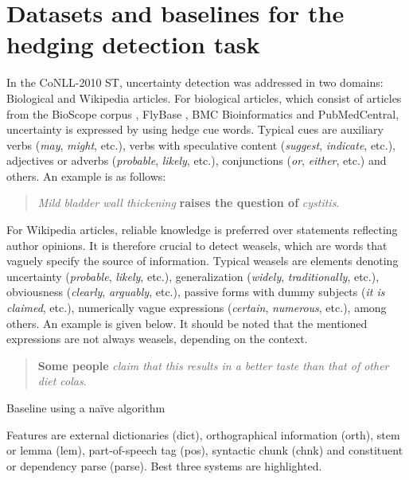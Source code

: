 \documentclass[english]{jnlp_1.4}
\begin{document}
\section{Datasets and baselines for the hedging detection task}

In the CoNLL-2010 ST, uncertainty detection was addressed in two domains: Biological and Wikipedia articles. For biological articles, which consist of articles from the BioScope corpus \cite{vincze08}, FlyBase , BMC Bioinformatics and PubMedCentral, uncertainty is expressed by using hedge cue words. Typical cues are auxiliary verbs (\emph{may}, \emph{might}, etc.), verbs with speculative content (\emph{suggest}, \emph{indicate}, etc.), adjectives or adverbs (\emph{probable}, \emph{likely}, etc.), conjunctions (\emph{or}, \emph{either}, etc.) and others. An example is as follows:

\vspace{0.5\Cvs}
\begin{quote}
	\emph{Mild bladder wall thickening }\textbf{raises the question of}\emph{ cystitis}.
\end{quote}
\vspace{0.5\Cvs}

For Wikipedia articles, reliable knowledge is preferred over statements reflecting author opinions. It is therefore crucial to detect weasels, which are words that vaguely specify the source of information. Typical weasels are elements denoting uncertainty (\emph{probable}, \emph{likely}, etc.), generalization (\emph{widely}, \emph{traditionally}, etc.), obviousness (\emph{clearly}, \emph{arguably}, etc.), passive forms with dummy subjects (\emph{it is claimed}, etc.), numerically vague expressions (\emph{certain}, \emph{numerous}, etc.), among others. An example is given below. It should be noted that the mentioned expressions are not always weasels, depending on the context.

\vspace{0.5\Cvs}
\begin{quote}
	\textbf{Some people}\emph{ claim that this results in a better taste than that of other diet colas}.
\end{quote}
\vspace{0.5\Cvs}

\begin{table}[b]
\caption{Baseline using a na\"{i}ve algorithm \protect{}}
\label{tab:benchmark}

\vspace{0.5\Cvs}
\end{table}
\begin{table}[b]
\label{tab:conll}

\par\vspace{0.5ex}
\small
Features are external dictionaries (dict), orthographical information (orth), stem or lemma (lem), part-of-speech tag (pos), syntactic chunk (chnk) and constituent or dependency parse (parse). Best three systems are highlighted.
\end{table}
\end{document}

